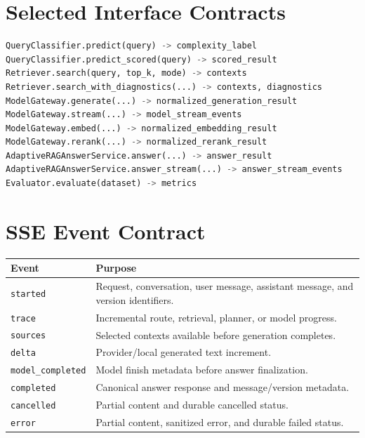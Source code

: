 \section{Selected Interface Contracts}

\begin{lstlisting}[language=Python,caption={Stable conceptual service interfaces.}]
QueryClassifier.predict(query) -> complexity_label
QueryClassifier.predict_scored(query) -> scored_result
Retriever.search(query, top_k, mode) -> contexts
Retriever.search_with_diagnostics(...) -> contexts, diagnostics
ModelGateway.generate(...) -> normalized_generation_result
ModelGateway.stream(...) -> model_stream_events
ModelGateway.embed(...) -> normalized_embedding_result
ModelGateway.rerank(...) -> normalized_rerank_result
AdaptiveRAGAnswerService.answer(...) -> answer_result
AdaptiveRAGAnswerService.answer_stream(...) -> answer_stream_events
Evaluator.evaluate(dataset) -> metrics
\end{lstlisting}

\section{SSE Event Contract}

\begin{longtable}{p{}p{}}
  \toprule
  Event & Purpose\\
  \midrule
  \texttt{started} & Request, conversation, user message, assistant message,
  and version identifiers.\\
  \texttt{trace} & Incremental route, retrieval, planner, or model progress.\\
  \texttt{sources} & Selected contexts available before generation completes.\\
  \texttt{delta} & Provider/local generated text increment.\\
  \texttt{model\_completed} & Model finish metadata before answer finalization.\\
  \texttt{completed} & Canonical answer response and message/version metadata.\\
  \texttt{cancelled} & Partial content and durable cancelled status.\\
  \texttt{error} & Partial content, sanitized error, and durable failed status.\\
  \bottomrule
\end{longtable}
